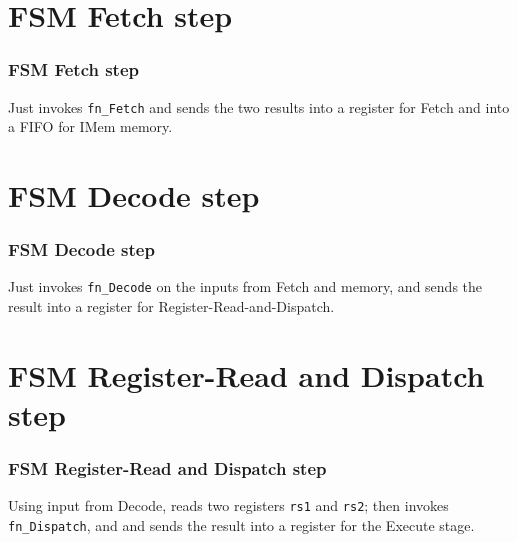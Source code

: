 
\section{FSM Fetch step}

\begin{frame}[fragile]
\frametitle{FSM Fetch step}

\footnotesize

\begin{minipage}{0.75\textwidth}
\end{minipage}
\hm
\begin{minipage}{0.2\textwidth}
 Just invokes {\tt fn\_Fetch} and sends the two results into a register for Fetch and
 into a FIFO for IMem memory.
\end{minipage}

\end{frame}


\section{FSM Decode step}

\begin{frame}[fragile]
\frametitle{FSM Decode step}

\footnotesize

\begin{minipage}{0.75\textwidth}
\end{minipage}
\hm
\begin{minipage}{0.2\textwidth}
 Just invokes {\tt fn\_Decode} on the inputs from Fetch and memory,
 and sends the result into a register for Register-Read-and-Dispatch.
\end{minipage}

\end{frame}


\section{FSM Register-Read and Dispatch step}

\begin{frame}[fragile]
\frametitle{FSM Register-Read and Dispatch step}

\footnotesize

\begin{minipage}{0.75\textwidth}
\end{minipage}
\hm
\begin{minipage}{0.2\textwidth}
 Using input from Decode, reads two registers {\tt rs1} and {\tt rs2};
 then invokes {\tt fn\_Dispatch}, and
 and sends the result into a register for the Execute stage.
\end{minipage}

\end{frame}

